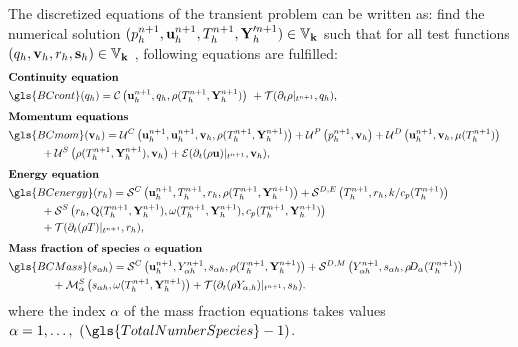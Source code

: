 The discretized equations of the transient problem can be written as: find the numerical solution $(p^{n+1}_h,\textbf{u}^{n+1}_h, T^{n+1}_h, \textbf{Y}'^{n+1}_h) \in \mathbb{V}_{\textbf{k}}$ such that for all test functions $(q_h,\textbf{v}_h, r_h, \mathbf{s}_h) \in \mathbb{V}_{\textbf{k}}$ , following equations are fulfilled:
\begin{subequations}
	\begin{flalign}%
		&\textbf{Continuity equation}& \notag \\
		&\gls{BCcont}(q_h)= \ContDis\ + \mathcal{T}(\partial_t \rho|_{t^{n+1}},q_h ) ,& \label{DiscretizedConti}\\[1ex]
		&\textbf{Momentum equations}& \notag \\
		&\gls{BCmom}(\vec{v}_h) =	\MomConv + \MomPres + \MomDiff & \notag\\
		& \quad\quad\quad + \MomSource + \mathcal{E}(\partial_t (\rho \vec{u})|_{t^{n+1}},\vec{v}_h ) ,& \label{DiscretizedMomentum}\\[1ex]
		&\textbf{Energy equation}& \notag \\
		&\gls{BCenergy}(r_h)
		 = \mathcal{S}^C\left(\vec{u}^{n+1}_h,T^{n+1}_h,r_h, \rhoh\right) + \mathcal{S}^{D,E}\left(T^{n+1}_h,r_h,k/c_p(T^{n+1}_h)\right)&  \notag\\
		& \quad\quad\quad + \mathcal{S}^S\left(r_h, \heatRelease(T^{n+1}_h,\vec{Y}^{n+1}_h), \rateReac(T^{n+1}_h,\vec{Y}^{n+1}_h),\cph\right)&\notag\\
		&\quad\quad\quad+ \mathcal{T}(\partial_t (\rho T)|_{t^{n+1}},r_h ),& \label{DiscretizedEnergy}   \\[1ex]
		&\textbf{Mass fraction of species $\alpha$ equation}& \notag \\
		&\gls{BCMass}(s_{\alpha h})= \mathcal{S}^C\left(\vec{u}^{n+1}_h,\Yi, s_{\alpha h}, \rhoh\right) + \mathcal{S}^{D,M}\left(\Yi,s_{\alpha h},\rhodh\right)&  \notag \\
		& \quad\quad\quad\quad + \mathcal{M}^S_\alpha\left(s_{\alpha h},\rateReac(T^{n+1}_h,\vec{Y}^{n+1}_h )\right) + \mathcal{T}(\partial_t (\rho Y_{\alpha,h})|_{t^{n+1}},s_h ).& \label{DiscretizedMassFractions}
	\end{flalign}\label{eqs:variatProblemFull}
\end{subequations}
where the index $\alpha$ of the mass fraction equations takes values $\alpha = 1, \dots,~(\gls{TotalNumberSpecies} - 1)$.
